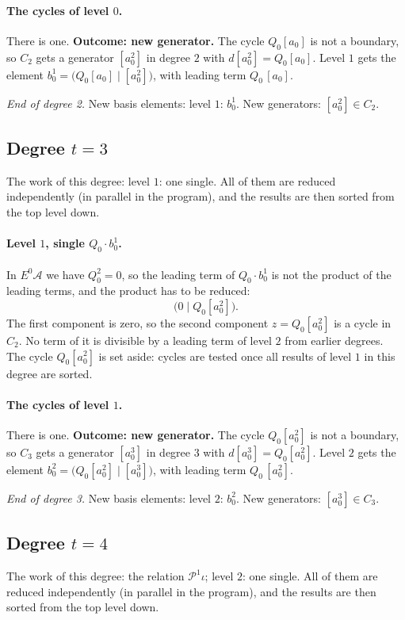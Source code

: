 \documentclass[11pt]{article}
\renewcommand{\P}{\mathcal{P}}
\newcommand{\A}{\mathcal{A}}
\begin{document}
\paragraph{The cycles of level $0$.} There is one.
\textbf{Outcome: new generator.} The cycle $Q_{0}[a_0]$ is not a boundary, so $C_{2}$ gets a generator $[a_0^2]$ in degree $2$ with $d[a_0^2] = Q_{0}[a_0]$.
Level $1$ gets the element $b^{1}_{0} = \bigl(Q_{0}[a_0] \;\big|\; [a_0^2]\bigr)$, with leading term $Q_{0}\,[a_0]$.
\medskip
\par\noindent\emph{End of degree 2.} New basis elements: level $1$: $b^{1}_{0}$. New generators: $[a_0^2]\in C_{2}$.
\subsection*{Degree $t = 3$}
\noindent The work of this degree: level $1$: one single. All of them are reduced independently (in parallel in the program), and the results are then sorted from the top level down.
\medskip
\paragraph{Level $1$, single $Q_{0}\cdot b^{1}_{0}$.} In $E^0\A$ we have $Q_{0}^2 = 0$, so the leading term of $Q_{0}\cdot b^{1}_{0}$ is not the product of the leading terms, and the product has to be reduced:
\[\bigl(0 \;\big|\; Q_{0}[a_0^2]\bigr).\]
The first component is zero, so the second component $z = Q_{0}[a_0^2]$ is a cycle in $C_{2}$.
No term of it is divisible by a leading term of level $2$ from earlier degrees.
The cycle $Q_{0}[a_0^2]$ is set aside: cycles are tested once all results of level $1$ in this degree are sorted.
\medskip
\paragraph{The cycles of level $1$.} There is one.
\textbf{Outcome: new generator.} The cycle $Q_{0}[a_0^2]$ is not a boundary, so $C_{3}$ gets a generator $[a_0^3]$ in degree $3$ with $d[a_0^3] = Q_{0}[a_0^2]$.
Level $2$ gets the element $b^{2}_{0} = \bigl(Q_{0}[a_0^2] \;\big|\; [a_0^3]\bigr)$, with leading term $Q_{0}\,[a_0^2]$.
\medskip
\par\noindent\emph{End of degree 3.} New basis elements: level $2$: $b^{2}_{0}$. New generators: $[a_0^3]\in C_{3}$.
\subsection*{Degree $t = 4$}
\noindent The work of this degree: the relation $\P^{1}\iota$; level $2$: one single. All of them are reduced independently (in parallel in the program), and the results are then sorted from the top level down.
\medskip
\end{document}
